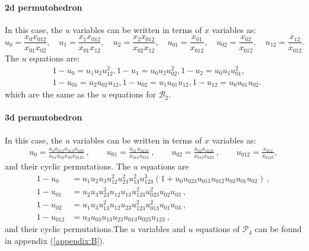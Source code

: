 \documentclass[hidelinks,12pt]{article}
\begin{document}
\paragraph*{2d permutohedron}
In this case, the $u$ variables can be written in terms of $x$ variables as:
\[
	u_{0}  = \frac{x_0 x_{012}}{x_{01}x_{02}},\quad 
	u_{1}  = \frac{x_1 x_{012}}{x_{01}x_{12}},\quad
	u_{2}  = \frac{x_2 x_{012}}{x_{02}x_{12}},\quad
	u_{01} = \frac{x_{01}}{x_{012}},\quad 
	u_{02} = \frac{x_{02}}{x_{012}},\quad
	u_{12} = \frac{x_{12}}{x_{012}}.
\]
The $u$ equations are:
\begin{align}\label{perm2}
	&1-u_{0}=u_{1} u_{2} u_{12}^2,
	1-u_{1}=u_{0} u_{2} u_{02}^2,
	1-u_{2}=u_{0} u_{1} u_{01}^2,\nonumber\\
	&1-u_{01}=u_{2} u_{02} u_{12},
	1-u_{02}=u_{1} u_{01} u_{12},
	1-u_{12}=u_{0} u_{01} u_{02}.
\end{align}
which are the same as the $u$ equations for $\mathscr{B}_{2}$.

\paragraph*{3d permutohedron}
In this case, 
the $u$ variables can be written in terms of $x$ variables as:
\begin{align*}
  u_{0} = \frac{x_{0}x_{012}x_{013}x_{023}}{x_{01}x_{02}x_{03}x_{0123}} \:,\qquad  
  u_{01} = \frac{x_{01}x_{0123}}{x_{012}x_{013}} \:,\qquad
  u_{02} = \frac{x_{02}x_{0123}}{x_{012}x_{023}}\:, \qquad 
  u_{012} = \frac{x_{012}}{x_{0123}},
\end{align*}
and their cyclic permutations. The $u$ equations are
\begin{align}\label{perm3}
  1-u_{0} &= u_1 u_{2} u_{3} u_{12}^2 u_{23}^2  u_{13}^2 u_{123}^3 \left(1+ u_{0}  u_{023} u_{013} u_{012} u_{03} u_{01}  u_{02} \right)\:,  \nonumber\\
  1-u_{0 1} &= u_{2} u_{3}  u_{23}^2 u_{12} u_{13} u_{123}^2 u_{023}^2 u_{02} u_{03} \:,\nonumber\\
  1-u_{02} &= u_{1}u_{3} u_{13}^{2}u_{12}u_{23} u_{123}^{2} u_{013}^{2}u_{01}u_{03} \:,\nonumber\\
 1-u_{012} &= u_3 u_{03}u_{13} u_{23} u_{0 1 3} u_{0 2 3} u_{123}  \:,
\end{align}
and their cyclic permutations.The $u$ variables and $u$ equations of $\mathscr P_4$ can be found in appendix (\ref{appendix:B}). 
\end{document}
